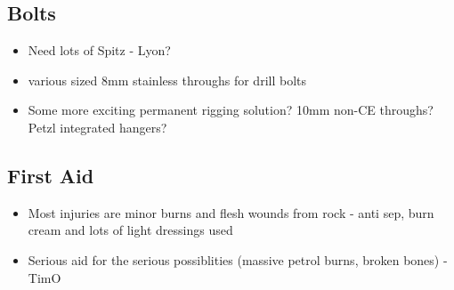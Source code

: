    \subsection{Bolts}
        \begin{itemize}
            \item Need lots of Spitz - Lyon?
            \item various sized 8mm stainless throughs for drill bolts
            \item Some more exciting permanent rigging solution? 10mm non-CE throughs? Petzl integrated hangers?
        \end{itemize}
        
    \subsection{First Aid}
        \begin{itemize}
            \item Most injuries are minor burns and flesh wounds from rock - anti sep, burn cream and lots of light dressings used
            \item Serious aid for the serious possiblities (massive petrol burns, broken bones) - TimO
        \end{itemize}
